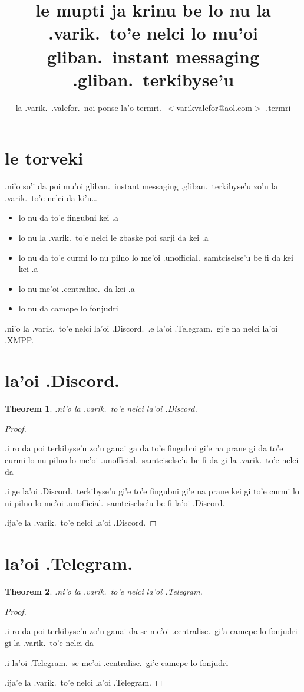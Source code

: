 \documentclass{article}
\title{le mupti ja krinu be lo nu la .varik.\ to'e nelci lo mu'oi gliban.\ instant messaging .gliban.\ terkibyse'u}
\author{la .varik.\ .valefor.\ noi ponse la'o termri.\ $<$varikvalefor@aol.com$>$ .termri}
\newtheorem{thm}{Theorem}
\begin{document}
\maketitle

\section{le torveki}
.ni'o so'i da poi mu'oi gliban.\ instant messaging .gliban.\ terkibyse'u zo'u la .varik.\ to'e nelci da ki'u\ldots
\begin{itemize}
	\item lo nu da to'e fingubni kei .a
	\item lo nu la .varik.\ to'e nelci le zbaske poi sarji da kei .a
	\item lo nu da to'e curmi lo nu pilno lo me'oi .unofficial.\ samtciselse'u be fi da kei kei .a
	\item lo nu me'oi .centralise.\ da kei .a
	\item lo nu da camcpe lo fonjudri
\end{itemize}

.ni'o la .varik.\ to'e nelci la'oi .Discord.\ .e la'oi .Telegram.\ gi'e na nelci la'oi .XMPP.
\section{la'oi .Discord.}
\begin{thm}
	.ni'o la .varik.\ to'e nelci la'oi .Discord.
\end{thm}
\begin{proof}
	${}$

	.i ro da poi terkibyse'u zo'u ganai ga da to'e fingubni gi'e na prane gi da to'e curmi lo nu pilno lo me'oi .unofficial.\ samtciselse'u be fi da gi la .varik.\ to'e nelci da

	.i ge la'oi .Discord.\ terkibyse'u gi'e to'e fingubni gi'e na prane kei gi to'e curmi lo ni pilno lo me'oi .unofficial.\ samtciselse'u be fi la'oi .Discord.

	.ija'e la .varik.\ to'e nelci la'oi .Discord.
\end{proof}

\section{la'oi .Telegram.}
\begin{thm}
	.ni'o la .varik.\ to'e nelci la'oi .Telegram.
\end{thm}
\begin{proof}
	${}$

	.i ro da poi terkibyse'u zo'u ganai da se me'oi .centralise.\ gi'a camcpe lo fonjudri gi la .varik.\ to'e nelci da

	.i la'oi .Telegram.\ se me'oi .centralise.\ gi'e camcpe lo fonjudri

	.ija'e la .varik.\ to'e nelci la'oi .Telegram.
\end{proof}
\end{document}
